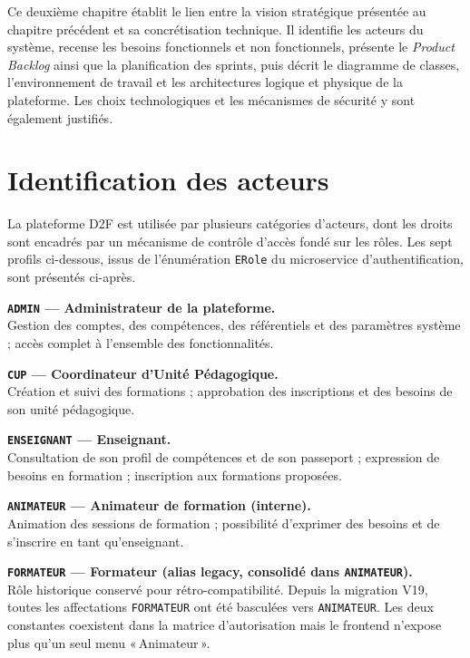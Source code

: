 \documentclass[12pt,a4paper]{report}
\begin{document}
Ce deuxième chapitre établit le lien entre la vision stratégique présentée au
chapitre précédent et sa concrétisation technique. Il identifie les acteurs du
système, recense les besoins fonctionnels et non fonctionnels, présente le
\textit{Product Backlog} ainsi que la planification des sprints, puis décrit le
diagramme de classes, l'environnement de travail et les architectures logique et
physique de la plateforme. Les choix technologiques et les mécanismes de sécurité
y sont également justifiés.

\section{Identification des acteurs}

La plateforme D2F est utilisée par plusieurs catégories d'acteurs, dont les
droits sont encadrés par un mécanisme de contrôle d'accès fondé sur les rôles.
Les sept profils ci-dessous, issus de l'énumération \texttt{ERole} du
microservice d'authentification, sont présentés ci-après.

\medskip

\textbf{\texttt{ADMIN} --- Administrateur de la plateforme.}\\
Gestion des comptes, des compétences, des référentiels et des paramètres
système ; accès complet à l'ensemble des fonctionnalités.

\medskip

\textbf{\texttt{CUP} --- Coordinateur d'Unité Pédagogique.}\\
Création et suivi des formations ; approbation des inscriptions et des besoins
de son unité pédagogique.

\medskip

\textbf{\texttt{ENSEIGNANT} --- Enseignant.}\\
Consultation de son profil de compétences et de son passeport ; expression de
besoins en formation ; inscription aux formations proposées.

\medskip

\textbf{\texttt{ANIMATEUR} --- Animateur de formation (interne).}\\
Animation des sessions de formation ; possibilité d'exprimer des besoins et de
s'inscrire en tant qu'enseignant.

\medskip

\textbf{\texttt{FORMATEUR} --- Formateur (alias legacy, consolidé dans \texttt{ANIMATEUR}).}\\
Rôle historique conservé pour rétro-compatibilité. Depuis la migration V19,
toutes les affectations \texttt{FORMATEUR} ont été basculées vers \texttt{ANIMATEUR}.
Les deux constantes coexistent dans la matrice d'autorisation mais le frontend
n'expose plus qu'un seul menu «\,Animateur\,».
\end{document}
